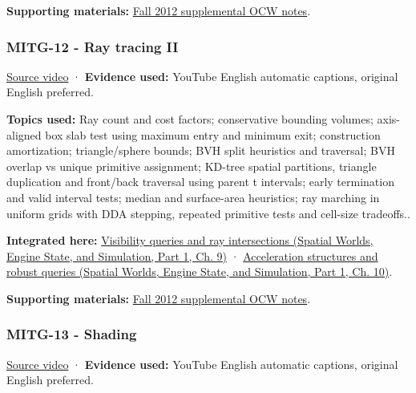 \textbf{Supporting materials:} \href{https://ocw.mit.edu/courses/6-837-computer-graphics-fall-2012/pages/lecture-notes/}{Fall 2012 supplemental OCW notes}.

\subsubsection{MITG-12 - Ray tracing II}\label{04-visual-computing-ii-ch036-mitg-12---ray-tracing-ii}

\hypertarget{04-visual-computing-ii-ch036-mitg-12---ray-tracing-ii}{}

\href{https://www.youtube.com/watch?v=mr_fHXW2YxE}{Source video} · \textbf{Evidence used:} YouTube English automatic captions, original English preferred.

\textbf{Topics used:} Ray count and cost factors; conservative bounding volumes; axis-aligned box slab test using maximum entry and minimum exit; construction amortization; triangle/sphere bounds; BVH split heuristics and traversal; BVH overlap vs unique primitive assignment; KD-tree spatial partitions, triangle duplication and front/back traversal using parent t intervals; early termination and valid interval tests; median and surface-area heuristics; ray marching in uniform grids with DDA stepping, repeated primitive tests and cell-size tradeoffs..

\textbf{Integrated here:} \href{../05-Spatial-Worlds-Engine-State-and-Simulation-P01/main.pdf\#04-visual-computing-ii-ch028-visibility-queries-and-ray-intersections-1}{Visibility queries and ray intersections (Spatial Worlds, Engine State, and Simulation, Part 1, Ch. 9)} · \href{../05-Spatial-Worlds-Engine-State-and-Simulation-P01/main.pdf\#04-visual-computing-ii-ch029-acceleration-structures-and-robust-queries-1}{Acceleration structures and robust queries (Spatial Worlds, Engine State, and Simulation, Part 1, Ch. 10)}.

\textbf{Supporting materials:} \href{https://ocw.mit.edu/courses/6-837-computer-graphics-fall-2012/pages/lecture-notes/}{Fall 2012 supplemental OCW notes}.

\subsubsection{MITG-13 - Shading}\label{04-visual-computing-ii-ch036-mitg-13---shading}

\hypertarget{04-visual-computing-ii-ch036-mitg-13---shading}{}

\href{https://www.youtube.com/watch?v=0xmeaXs5-ZU}{Source video} · \textbf{Evidence used:} YouTube English automatic captions, original English preferred.

